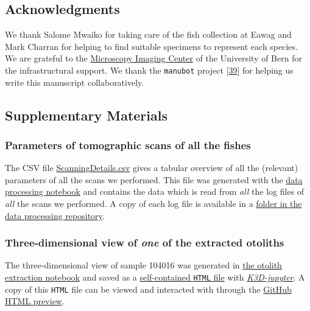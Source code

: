 \hypertarget{acknowledgments}{%
\subsection{Acknowledgments}\label{acknowledgments}}

We thank Salome Mwaiko for taking care of the fish collection at Eawag and Mark Charran for helping to find suitable specimens to represent each species.
We are grateful to the \href{https//www.mic.unibe.ch/}{Microscopy Imaging Center} of the University of Bern for the infrastructural support.
We thank the \texttt{manubot} project {[}\protect\hyperlink{ref-YuJbg3zO}{39}{]} for helping us write this manuscript collaboratively.

\hypertarget{supplementary-materials}{%
\subsection{Supplementary Materials}\label{supplementary-materials}}

\hypertarget{parameters-of-tomographic-scans-of-all-the-fishes}{%
\subsubsection{Parameters of tomographic scans of all the fishes}\label{parameters-of-tomographic-scans-of-all-the-fishes}}

The CSV file \href{https://github.com/habi/EAWAG-manuscript/blob/main/content/data/ScanningDetails.csv}{ScanningDetails.csv} gives a tabular overview of all the (relevant) parameters of all the scans we performed.
This file was generated with the \href{https://github.com/habi/EAWAG/blob/master/DataWrangling.ipynb}{data processing notebook} and contains the data which is read from \emph{all} the log files of \emph{all} the scans we performed.
A copy of each log file is available in a \href{https://github.com/habi/EAWAG/tree/master/logfiles}{folder in the data processing repository}.

\hypertarget{three-dimensional-view-of-one-of-the-extracted-otoliths}{%
\subsubsection{\texorpdfstring{Three-dimensional view of \emph{one} of the extracted otoliths}{Three-dimensional view of one of the extracted otoliths}}\label{three-dimensional-view-of-one-of-the-extracted-otoliths}}

The three-dimensional view of sample 104016 was generated in \href{https://github.com/habi/EAWAG/blob/master/ExtractOtoliths.ipynb}{the otolith extraction notebook} and saved as a \href{https://github.com/habi/EAWAG-manuscript/blob/main/content/data/104016.head.rec.otolith.region.3D.html}{self-contained \texttt{HTML} file} with \href{https://github.com/K3D-tools/K3D-jupyter}{\emph{K3D-jupyter}}.
A copy of this \texttt{HTML} file can be viewed and interacted with through the \href{https://htmlpreview.github.io/?https://github.com/habi/EAWAG-manuscript/blob/main/content/data/104016_Enterochromis_I_cinctus_St_E.head.rec.Otolith.Region.3D.html}{GitHub HTML preview}.

